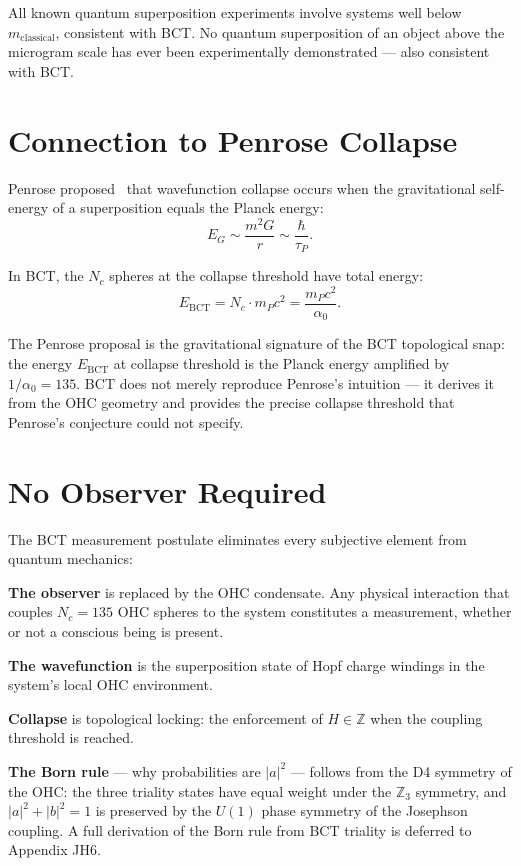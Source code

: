 \documentclass[aps,prl,twocolumn,superscriptaddress,showpacs]{revtex4-2}
\begin{document}
All known quantum superposition experiments involve systems well below 
$m_\mathrm{classical}$, consistent with BCT. No quantum superposition of 
an object above the microgram scale has ever been experimentally 
demonstrated --- also consistent with BCT.

\section{Connection to Penrose Collapse}

Penrose proposed~\cite{Penrose1996} that wavefunction collapse occurs when 
the gravitational self-energy of a superposition equals the Planck energy:
\begin{equation}
E_G \sim \frac{m^2 G}{r} \sim \frac{\hbar}{\tau_P}.
\end{equation}

In BCT, the $N_c$ spheres at the collapse threshold have total energy:
\begin{equation}
E_\mathrm{BCT} = N_c \cdot m_P c^2 = \frac{m_P c^2}{\alpha_0}.
\end{equation}

The Penrose proposal is the gravitational signature of the BCT topological 
snap: the energy $E_\mathrm{BCT}$ at collapse threshold is the Planck 
energy amplified by $1/\alpha_0 = 135$. BCT does not merely reproduce 
Penrose's intuition --- it derives it from the OHC geometry and provides 
the precise collapse threshold that Penrose's conjecture could not specify.

\section{No Observer Required}

The BCT measurement postulate eliminates every subjective element from 
quantum mechanics:

\textbf{The observer} is replaced by the OHC condensate. Any physical 
interaction that couples $N_c = 135$ OHC spheres to the system constitutes 
a measurement, whether or not a conscious being is present.

\textbf{The wavefunction} is the superposition state of Hopf charge 
windings in the system's local OHC environment.

\textbf{Collapse} is topological locking: the enforcement of $H\in\mathbb{Z}$ 
when the coupling threshold is reached.

\textbf{The Born rule} --- why probabilities are $|a|^2$ --- follows from 
the D4 symmetry of the OHC: the three triality states have equal weight 
under the $\mathbb{Z}_3$ symmetry, and $|a|^2 + |b|^2 = 1$ is preserved 
by the $U(1)$ phase symmetry of the Josephson coupling. A full derivation 
of the Born rule from BCT triality is deferred to Appendix JH6.
\end{document}
